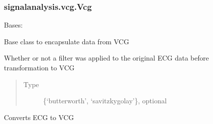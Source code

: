 \documentclass[letterpaper,10pt,english]{sphinxmanual}
\begin{document}
\subsubsection{signalanalysis.vcg.Vcg}
\label{\detokenize{_autosummary/signalanalysis.vcg.Vcg:signalanalysis-vcg-vcg}}\label{\detokenize{_autosummary/signalanalysis.vcg.Vcg::doc}}

\begin{fulllineitems}
\label{\detokenize{_autosummary/signalanalysis.vcg.Vcg:signalanalysis.vcg.Vcg}}
\sphinxAtStartPar
Bases: {\hyperref[\detokenize{_autosummary/signalanalysis.general.Signal:signalanalysis.general.Signal}]{}}

\sphinxAtStartPar
Base class to encapsulate data from VCG

\begin{fulllineitems}
\label{\detokenize{_autosummary/signalanalysis.vcg.Vcg:signalanalysis.vcg.Vcg.ecg_filter}}
\sphinxAtStartPar
Whether or not a filter was applied to the original ECG data before transformation to VCG
\begin{quote}\begin{description}
\item[{Type}] \leavevmode
\sphinxAtStartPar
\{‘butterworth’, ‘savitzky\sphinxhyphen{}golay’\}, optional

\end{description}\end{quote}

\end{fulllineitems}


\begin{fulllineitems}
\label{\detokenize{_autosummary/signalanalysis.vcg.Vcg:signalanalysis.vcg.Vcg.get_from_ecg}}
\sphinxAtStartPar
Converts ECG to VCG


\end{fulllineitems}
\end{fulllineitems}
\end{document}
